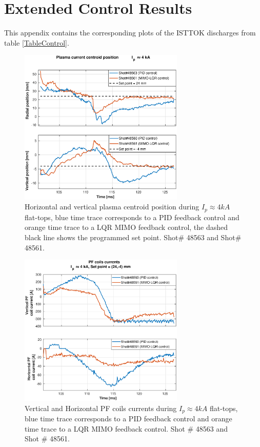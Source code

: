 \chapter{Extended Control Results }
\label{Control_Results}
This appendix contains the corresponding plots of the ISTTOK discharges from table \ref{TableControl}.

\begin{figure}[h]
	\centering
	\includegraphics[width=0.7\textwidth]{Chp5/PIDvsMIMO_563_561_2.eps}
	\caption{Horizontal and vertical plasma centroid position during  $I_p\approx 4kA$  flat-tops, blue time trace corresponds to a PID feedback control and orange time trace to a LQR MIMO feedback control, the dashed black line shows the programmed set point. Shot$\#$ 48563 and Shot$\#$ 48561.}
\end{figure}

\begin{figure}
	\centering
	\includegraphics[width=0.7\textwidth]{Chp5/PIDvsMIMO_563_561_curr_2.eps}
	\caption{  Vertical and Horizontal PF coils currents during  $I_p\approx 4kA$  flat-tops, blue time trace corresponds to a PID feedback control and orange time trace to a LQR MIMO feedback control. Shot $\#$ 48563 and Shot $\#$ 48561.}
\end{figure}

